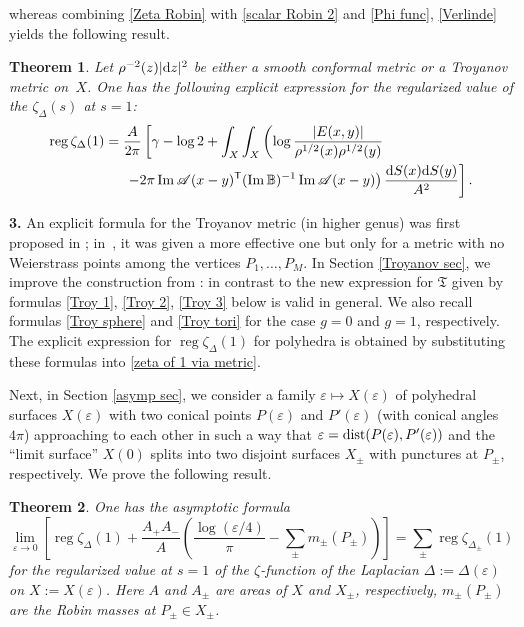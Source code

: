 \documentclass[pdftex]{sigma}
\numberwithin{equation}{section}
\newtheorem{Theorem}{Theorem}[section]
\theoremstyle{definition}
\begin{document}
whereas
combining \eqref{Zeta Robin} with \eqref{scalar Robin 2} and \eqref{Phi func}, \eqref{Verlinde} yields
the following result.
\begin{Theorem}
Let $\rho^{-2}(z)|{\rm d}z|^2$ be either a smooth conformal metric or a Troyanov metric on~$X$.
One has the following explicit expression for the regularized value of the $\zeta_\Delta(s)$ at $s=1$:
\begin{align}
\operatorname{reg}\zeta_\Delta(1)={}&\frac{A}{2\pi}\left[\gamma-\log 2+\int_{X}\int_{X}\left(\log \frac{|E(x,y)|}{\rho^{1/2}(x)\rho^{1/2}(y)}\right.\right.\nonumber\\
&\left.\left.-2\pi\operatorname{Im}\mathscr{A}(x-y)^{\mathsf T}(\operatorname{Im}\mathbb{B})^{-1}\operatorname{Im}\mathscr{A}(x-y)\right)\frac{{\rm d }S(x) {\rm d }S(y)}{A^2}\right] .
\label{zeta of 1 via metric}
\end{align}
\end{Theorem}

{\bf 3.} An explicit formula for the Troyanov metric (in higher genus) was first proposed in \cite{KokLN}; in~\cite{KokPAMS}, it was given a more effective one but only for a metric with no Weierstrass points among the vertices $P_1,\dots,P_M$. In Section \ref{Troyanov sec}, we improve the construction from \cite{KokPAMS}: in contrast to \cite{KokPAMS} the new expression for $\mathfrak{T}$ given by formulas \eqref{Troy 1}, \eqref{Troy 2}, \eqref{Troy 3} below is valid in general. We also recall formulas \eqref{Troy sphere} and \eqref{Troy tori} for the case $g=0$ and $g=1$, respectively. The explicit expression for $\operatorname{reg}\zeta_\Delta(1)$ for polyhedra is obtained by substituting these formulas into \eqref{zeta of 1 via metric}.

Next, in Section \ref{asymp sec}, we consider a family $\varepsilon\mapsto X(\varepsilon)$ of polyhedral surfaces $X(\varepsilon)$ with two conical points $P(\varepsilon)$ and $P'(\varepsilon)$ (with conical angles $4\pi$) approaching to each other in such a way that $\varepsilon={\rm dist}(P(\varepsilon),P'(\varepsilon))$ and the ``limit surface'' $X(0)$ splits into two disjoint surfaces $X_\pm$ with punctures at $P_\pm$, respectively. We prove the following result.
\begin{Theorem} One has the asymptotic formula
\begin{equation}
\label{zeta 1 asymp}
\lim_{\varepsilon\to 0}\left[\operatorname{reg} \zeta_{\Delta}(1)+\frac{A_+ A_-}{A}\left(\frac{\log (\varepsilon/4)}{\pi}-\sum_\pm m_\pm(P_\pm)\right)\right]=\sum_{\pm}\operatorname{reg} \zeta_{\Delta_{\pm}}(1)
\end{equation}
for the regularized value at $s=1$ of the $\zeta$-function of the Laplacian $\Delta:=\Delta(\varepsilon)$ on $X:=X(\varepsilon)$. Here $A$ and $A_\pm$ are areas of $X$ and $X_\pm$, respectively, $m_\pm(P_\pm)$ are the Robin masses at $P_\pm\in X_\pm$.
\end{Theorem}
\end{document}
